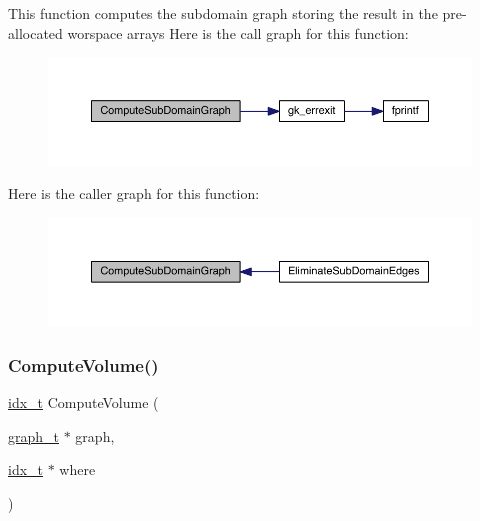 This function computes the subdomain graph storing the result in the pre-\/allocated worspace arrays Here is the call graph for this function\+:\nopagebreak
\begin{figure}[H]
\begin{center}
\leavevmode
\includegraphics[width=350pt]{a00945_a78c50bcdffefbd90914a77c4add573cc_cgraph}
\end{center}
\end{figure}
Here is the caller graph for this function\+:\nopagebreak
\begin{figure}[H]
\begin{center}
\leavevmode
\includegraphics[width=350pt]{a00945_a78c50bcdffefbd90914a77c4add573cc_icgraph}
\end{center}
\end{figure}
\mbox{\label{a00945_ae79bf6d99689af2bbe6145846a42e31d}} 
\subsubsection{\texorpdfstring{Compute\+Volume()}{ComputeVolume()}}
{\footnotesize\ttfamily \hyperlink{a00876_aaa5262be3e700770163401acb0150f52}{idx\+\_\+t} Compute\+Volume (\begin{DoxyParamCaption}\item[{\hyperlink{a00734}{graph\+\_\+t} $\ast$}]{graph,  }\item[{\hyperlink{a00876_aaa5262be3e700770163401acb0150f52}{idx\+\_\+t} $\ast$}]{where }\end{DoxyParamCaption})}

